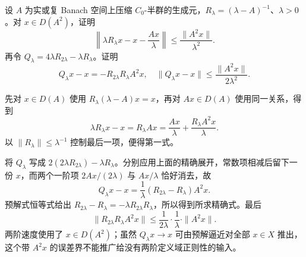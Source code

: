 \begin{exercise}\label{b2:ex:app-D-5}
设 \(A\) 为实或复 Banach 空间上压缩 \(C_0\)-半群的生成元，\(R_\lambda=(\lambda-A)^{-1}\)、\(\lambda>0\)。对 \(x\in D(A^2)\)，证明
\[
 \left\|\lambda R_\lambda x-x-\frac{Ax}{\lambda}\right\|
 \leq\frac{\|A^2x\|}{\lambda^2}.
\]
再令 \(Q_\lambda=4\lambda R_{2\lambda}-\lambda R_\lambda\)。证明
\[
 Q_\lambda x-x=-R_{2\lambda}R_\lambda A^2x,
 \quad \|Q_\lambda x-x\|\leq\frac{\|A^2x\|}{2\lambda^2}.
\]
\end{exercise}
\begin{solution}
先对 \(x\in D(A)\) 使用 \(R_\lambda(\lambda-A)x=x\)，再对 \(Ax\in D(A)\) 使用同一关系，得到
\[
 \lambda R_\lambda x-x=R_\lambda Ax
 =\frac{Ax}{\lambda}+\frac{R_\lambda A^2x}{\lambda}.
\]
以 \(\|R_\lambda\|\leq\lambda^{-1}\) 控制最后一项，便得第一式。

将 \(Q_\lambda\) 写成 \(2(2\lambda R_{2\lambda})-\lambda R_\lambda\)。分别应用上面的精确展开，常数项相减后留下一份 \(x\)，而两个一阶项 \(2Ax/(2\lambda)\) 与 \(Ax/\lambda\) 恰好消去，故
\[
 Q_\lambda x-x
 =\frac1\lambda(R_{2\lambda}-R_\lambda)A^2x.
\]
预解式恒等式给出 \(R_{2\lambda}-R_\lambda=-\lambda R_{2\lambda}R_\lambda\)，所以得到所求精确式。最后
\[
 \|R_{2\lambda}R_\lambda A^2x\|
 \leq\frac1{2\lambda}\cdot\frac1\lambda\cdot\|A^2x\|.
\]
两阶速度使用了 \(x\in D(A^2)\)；虽然 \(Q_\lambda x\to x\) 可由预解逼近对全部 \(x\in X\) 推出，这个带 \(A^2x\) 的误差界不能推广给没有两阶定义域正则性的输入。
\end{solution}

